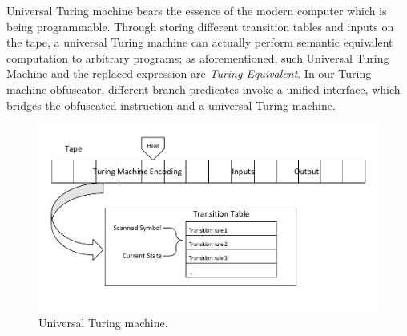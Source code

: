 Universal Turing machine bears the essence of the modern computer which is being
programmable. Through storing different transition tables and inputs on the tape, 
a universal
Turing machine can actually perform semantic equivalent computation to arbitrary
programs; as aforementioned, such Universal Turing Machine and the replaced
expression are \textit{Turing Equivalent}. In our Turing machine obfuscator,
different branch predicates invoke a unified interface, which bridges the
obfuscated instruction and a universal Turing machine.

\begin{figure}
 \includegraphics[width=\linewidth]{UTM.pdf}
 \caption{Universal Turing machine.}
 \label{fig:four}
\end{figure}

